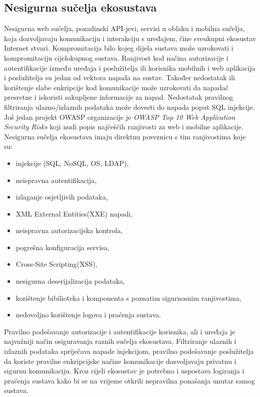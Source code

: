\documentclass[times, utf8, diplomski]{fer}
\begin{document}
\subsection{Nesigurna sučelja ekosustava}
Nesigurna web sučelja, pozadinski API-jevi, servisi u oblaku i mobilna sučelja, koja dozvoljavaju komunikaciju i interakciju s uređajem, čine sveukupni ekosustav Internet stvari. Kompromitacija bilo kojeg dijela sustava može uzrokovati i kompromitaciju cijelokupnog sustava. Ranjivost kod načina autorizacije i autentifikacije između uređaja i poslužitelja ili korisnika mobilnih i web aplikacija i poslužitelja su jedan od vektora napada na sustav. Također nedostatak ili korištenje slabe enkripcije kod komunikacije može uzrokovati da napadač presretne i iskoristi sakupljene informacije za napad. Nedostatak pravilnog filtriranja ulazno/izlaznih podataka može dovesti do napada poput SQL injekcije. Još jedan projekt OWASP organizacije je \emph{OWASP Top 10 Web Application Security Risks} koji nudi popis najčešćih ranjivosti za web i mobilne aplikacije. Nesigurna sučelja ekosustava imaju direktnu poveznicu s tim ranjivostima koje su: \begin{itemize}
    \item injekcije (SQL, NoSQL, OS, LDAP),
    \item neispravna autentifikacija,
    \item izlaganje osjetljivih podataka,
    \item XML External Entities(XXE) napadi,
    \item neispravna autorizacijska kontrola,
    \item pogrešna konfiguracija servisa,
    \item Cross-Site Scripting(XSS),
    \item nesigurna deserijalizacija podataka,
    \item korištenje bibilioteka i komponenta s poznatim sigurnosnim ranjivostima,
    \item nedovoljno korištenje logova i praćenja sustava.\citep{owasp2}
\end{itemize}

Pravilno podešavanje autorizacije i autentifikacije korisnika, ali i uređaja je najvažniji način osiguravanja raznih sučelja ekosustava. Filtriranje ulaznih i izlaznih podataka spriječava napade injekcijom, pravilno podešavanje poslužitelja da koriste pravilne enkripcijske načine komunikacije dozvoljavaju privatnu i sigurnu komunikaciju. Kroz cijeli ekosustav je potrebno i uspostava logiranja i praćenja sustava kako bi se na vrijeme otkrili nepravilna ponašanja unutar samog sustava.
\end{document}
